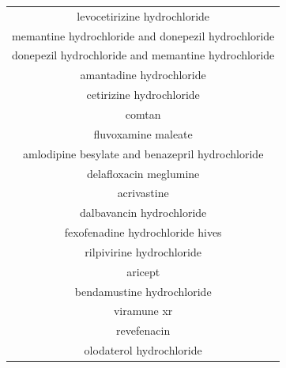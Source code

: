 \documentclass{article}
\newcommand{\lgc}[1]{\cellcolor[gray]{0.85}#1}
\begin{document}
\begin{table}[p]
\begin{tabular}[t]{c}
levocetirizine hydrochloride \\
\lgc{memantine hydrochloride and donepezil hydrochloride\cite{rejdak2020adamantanes}} \\
\lgc{donepezil hydrochloride and memantine hydrochloride\cite{rejdak2020adamantanes}} \\
\lgc{amantadine hydrochloride\cite{rejdak2020adamantanes}} \\
cetirizine hydrochloride \\
comtan \\
\lgc{fluvoxamine maleate\cite{stopcovid}} \\
\lgc{amlodipine besylate and benazepril hydrochloride\cite{Zhang2020.04.08.20047134}} \\
delafloxacin meglumine \\
acrivastine \\
dalbavancin hydrochloride \\
\lgc{fexofenadine hydrochloride hives\cite{Farag2020}} \\
rilpivirine hydrochloride \\
aricept \\
bendamustine hydrochloride \\
viramune xr \\
revefenacin \\
olodaterol hydrochloride \\
\hline
\end{tabular}
\end{table}
\end{document}
